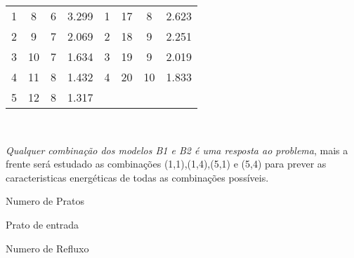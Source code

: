 \documentclass[\mainfilename]{subfiles}
\begin{document}
\begin{sectionBox}
\begin{center}
\begin{tabular}{*{4}{C} | *{4}{C}}
            \\\midrule
            
                    1 &  8 & 6 & 3.299 & 1 & 17 &  8 & 2.623
                \\  2 &  9 & 7 & 2.069 & 2 & 18 &  9 & 2.251
                \\  3 & 10 & 7 & 1.634 & 3 & 19 &  9 & 2.019
                \\  4 & 11 & 8 & 1.432 & 4 & 20 & 10 & 1.833
                \\  5 & 12 & 8 & 1.317 &  
                
            \\\bottomrule
        \end{tabular}
        \\[1ex]
        \vspace{2ex}
    \end{center}

    \emph{Qualquer combinação dos modelos B1 e B2 é uma resposta ao problema}, mais a frente será estudado as combinações (1,1),(1,4),(5,1) e (5,4) para prever as caracteristicas energéticas de todas as combinações possíveis.

    \begin{description}[
        leftmargin=!,
        labelwidth=\widthof{NSTAGES} %
    ]
        \item[NSTAGES] Numero de Pratos
        \item[FSTAGE] Prato de entrada
        \item[RR] Numero de Refluxo
    \end{description}
    
\end{sectionBox}
\end{document}
